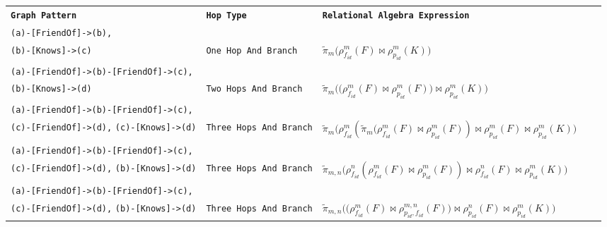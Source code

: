 \documentclass{beamer}
\newcommand{\rename}[3]{\rho_{#1}^{#2}\left(#3\right)}
\newcommand{\NJoin}{\bowtie}
\newcommand*\trans[1]{\llparenthesis{#1}\rrparenthesis}
\begin{document}
\begin{frame}

    \begin{table}[h]
      \resizebox{1.1\textwidth}{!}
      {%
      \begin{tabular}{llp{10cm}ll}
      \cline{1-3}
       \textbf{\texttt{Graph Pattern}} & \textbf{\texttt{Hop Type}}  & \textbf{\texttt{Relational Algebra Expression}} &  &  \\ \cline{1-3}
       \texttt{(a)-[FriendOf]->(b),} \\ \texttt{(b)-[Knows]->(c)}& \texttt{One Hop And Branch} & $\widetilde\pi_{m} \Bigg( \rename {f_{id}} m F \NJoin \rename {p_{id}} m K \Bigg)$ &  &  \\ \cline{1-3}
       \texttt{(a)-[FriendOf]->(b)-[FriendOf]->(c),} \\ \texttt{(b)-[Knows]->(d)}& \texttt{Two Hops And Branch} & $\widetilde\pi_{m} \Bigg( \bigg( \rename {f_{id}} m F \NJoin \rename {p_{id}} m F \bigg) \NJoin \rename {p_{id}} m K \Bigg)$ &  &  \\ \cline{1-3}
       \texttt{(a)-[FriendOf]->(b)-[FriendOf]->(c),} \\ \texttt{(c)-[FriendOf]->(d),}  \texttt{(c)-[Knows]->(d)}& \texttt{Three Hops And Branch} & $ \widetilde\pi_{m} \Bigg( \rename{f_{id}}{m}{\widetilde\pi_{m}(\rename {f_{id}} m F \NJoin \rename {p_{id}} m F} \NJoin \rename{p_{id}}{m}{F} \NJoin \rename{p_{id}}{m}{K} \Bigg)$ &  &  \\ \cline{1-3}
       \texttt{(a)-[FriendOf]->(b)-[FriendOf]->(c),} \\ \texttt{(c)-[FriendOf]->(d),}  \texttt{(b)-[Knows]->(d)}& \texttt{Three Hops And Branch} & $ \widetilde\pi_{m,n} \Bigg( \rename{f_{id}}{n}{\rename{f_{id}}{m}{F} \NJoin \rename{p_{id}}{m}{F}} \NJoin \rename{f_{id}}{n}{F} \NJoin \rename{p_{id}}{m}{K} \Bigg) $ &  &  \\ \cline{1-3}
       \texttt{(a)-[FriendOf]->(b)-[FriendOf]->(c),} \\ \texttt{(c)-[FriendOf]->(d),}  \texttt{(b)-[Knows]->(d)}& \texttt{Three Hops And Branch} & $ \widetilde\pi_{m,n} \Bigg ( \Big( \rename{f_{id}}{m}{F} \NJoin \rename{p_{id}, f_{id}}{m,n}{F} \Big) \NJoin \rename{p_{id}}{n}{F} \NJoin \rename{p_{id}}{m}{K} \Bigg ) $ &  &  \\ \cline{1-3}
      \end{tabular}%
      }
      \end{table}
    
\end{frame}
\end{document}
